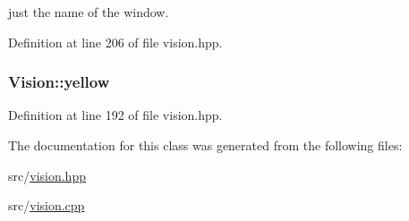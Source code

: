 just the name of the window. 



Definition at line 206 of file vision.\+hpp.

\subsubsection[{\texorpdfstring{yellow}{yellow}}]{ Vision\+::yellow\hspace{0.3cm}{\ttfamily [private]}}\hypertarget{class_vision_ad0e403eecfd6f309dbb94f2dd7c4696a}{}\label{class_vision_ad0e403eecfd6f309dbb94f2dd7c4696a}


Definition at line 192 of file vision.\+hpp.



The documentation for this class was generated from the following files\+:\begin{DoxyCompactItemize}
\item 
src/\hyperlink{vision_8hpp}{vision.\+hpp}\item 
src/\hyperlink{vision_8cpp}{vision.\+cpp}\end{DoxyCompactItemize}
